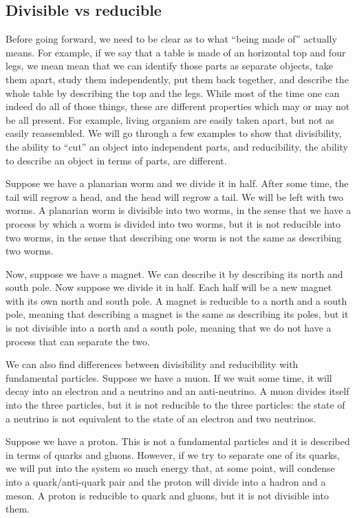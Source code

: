\subsection{Divisible vs reducible}

Before going forward, we need to be clear as to what ``being made of'' actually means. For example, if we say that a table is made of an horizontal top and four legs, we mean mean that we can identify those parts as separate objects, take them apart, study them independently, put them back together, and describe the whole table by describing the top and the legs. While most of the time one can indeed do all of those things, these are different properties which may or may not be all present. For example, living organism are easily taken apart, but not as easily reassembled. We will go through a few examples to show that divisibility, the ability to ``cut'' an object into independent parts, and reducibility, the ability to describe an object in terms of parts, are different.

Suppose we have a planarian worm and we divide it in half. After some time, the tail will regrow a head, and the head will regrow a tail. We will be left with two worms. A planarian worm is divisible into two worms, in the sense that we have a process by which a worm is divided into two worms, but it is not reducible into two worms, in the sense that describing one worm is not the same as describing two worms.

Now, suppose we have a magnet. We can describe it by describing its north and south pole. Now suppose we divide it in half. Each half will be a new magnet with its own north and south pole. A magnet is reducible to a north and a south pole, meaning that describing a magnet is the same as describing its poles, but it is not divisible into a north and a south pole, meaning that we do not have a process that can separate the two.

We can also find differences between divisibility and reducibility with fundamental particles. Suppose we have a muon. If we wait some time, it will decay into an electron and a neutrino and an anti-neutrino. A muon divides itself into the three particles, but it is not reducible to the three particles: the state of a neutrino is not equivalent to the state of an electron and two neutrinos.

Suppose we have a proton. This is not a fundamental particles and it is described in terms of quarks and gluons. However, if we try to separate one of its quarks, we will put into the system so much energy that, at some point, will condense into a quark/anti-quark pair and the proton will divide into a hadron and a meson. A proton is reducible to quark and gluons, but it is not divisible into them.

